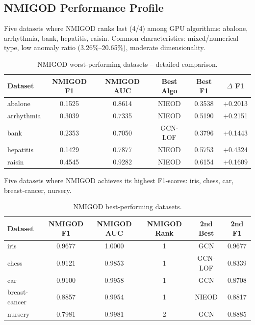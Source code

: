 \documentclass[11pt,a4paper]{article}
\begin{document}
\subsection{NMIGOD Performance Profile}
Five datasets where NMIGOD ranks last (4/4) among GPU algorithms: abalone, arrhythmia, bank, hepatitis, raisin. Common characteristics: mixed/numerical type, low anomaly ratio (3.26\%--20.65\%), moderate dimensionality.
\begin{table}[H]\centering\caption{NMIGOD worst-performing datasets -- detailed comparison.}\label{tab:worst}\small
\begin{tabular}{lccccc}
\toprule
Dataset & NMIGOD F1 & NMIGOD AUC & Best Algo & Best F1 & $\Delta$ F1 \\
\midrule
abalone & 0.1525 & 0.8614 & NIEOD & 0.3538 & +0.2013 \\
arrhythmia & 0.3039 & 0.7335 & NIEOD & 0.5190 & +0.2151 \\
bank & 0.2353 & 0.7050 & GCN-LOF & 0.3796 & +0.1443 \\
hepatitis & 0.1429 & 0.7877 & NIEOD & 0.5753 & +0.4324 \\
raisin & 0.4545 & 0.9282 & NIEOD & 0.6154 & +0.1609 \\
\bottomrule\end{tabular}\end{table}

Five datasets where NMIGOD achieves its highest F1-scores: iris, chess, car, breast-cancer, nursery.
\begin{table}[H]\centering\caption{NMIGOD best-performing datasets.}\label{tab:best}\small
\begin{tabular}{lccccc}
\toprule
Dataset & NMIGOD F1 & NMIGOD AUC & NMIGOD Rank & 2nd Best & 2nd F1 \\
\midrule
iris & 0.9677 & 1.0000 & 1 & GCN & 0.9677 \\
chess & 0.9121 & 0.9853 & 1 & GCN-LOF & 0.8339 \\
car & 0.9100 & 0.9958 & 1 & GCN & 0.8708 \\
breast-cancer & 0.8857 & 0.9954 & 1 & NIEOD & 0.8817 \\
nursery & 0.7981 & 0.9981 & 2 & GCN & 0.8885 \\
\bottomrule\end{tabular}\end{table}
\end{document}
